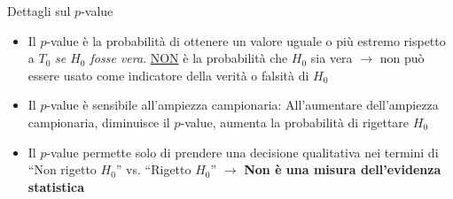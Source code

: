\documentclass[compress, xcolor=table]{beamer}
\begin{document}
\begin{frame}{Dettagli sul $p$-value}
	
	\begin{itemize}
		\item Il $p$-value è la probabilità di ottenere un valore uguale o più estremo rispetto a $T_0$ \emph{se $H_0$ fosse vera}. \underline{NON} è la probabilità che $H_0$ sia vera $\rightarrow$ non può essere usato come indicatore della verità o falsità di $H_0$
		\item Il $p$-value è sensibile all'ampiezza campionaria: All'aumentare dell'ampiezza campionaria, diminuisce il $p$-value, aumenta la probabilità di rigettare $H_0$
		\item Il $p$-value permette solo di prendere una decisione qualitativa nei termini di ``Non rigetto $H_0$'' vs. ``Rigetto $H_0$'' $\rightarrow$ \textbf{Non è una misura dell'evidenza statistica}
		 
	\end{itemize}
\end{frame}

	
\end{document}
